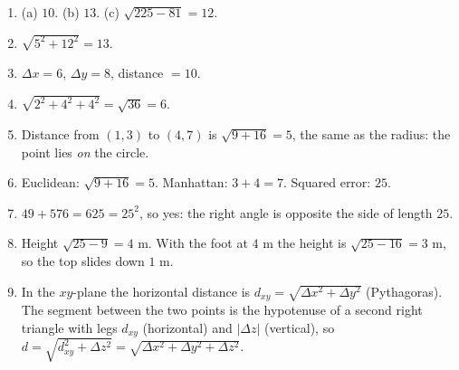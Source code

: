 \begin{enumerate}[label=\textbf{\ansnum.\arabic*}]
  \item (a) $10$. (b) $13$. (c) $\sqrt{225-81}=12$.
  \item $\sqrt{5^2+12^2}=13$.
  \item $\Delta x=6$, $\Delta y=8$, distance $=10$.
  \item $\sqrt{2^2+4^2+4^2}=\sqrt{36}=6$.
  \item Distance from $(1,3)$ to $(4,7)$ is $\sqrt{9+16}=5$, the same as the radius: the point lies \emph{on} the circle.
  \item Euclidean: $\sqrt{9+16}=5$. Manhattan: $3+4=7$. Squared error: $25$.
  \item $49+576=625=25^2$, so yes: the right angle is opposite the side of length $25$.
  \item Height $\sqrt{25-9}=4$ m. With the foot at $4$ m the height is $\sqrt{25-16}=3$ m, so the top slides down $1$ m.
  \item In the $xy$-plane the horizontal distance is $d_{xy}=\sqrt{\Delta x^2+\Delta y^2}$ (Pythagoras). The segment between the two points is the hypotenuse of a second right triangle with legs $d_{xy}$ (horizontal) and $|\Delta z|$ (vertical), so $d=\sqrt{d_{xy}^2+\Delta z^2}=\sqrt{\Delta x^2+\Delta y^2+\Delta z^2}$.
\end{enumerate}
